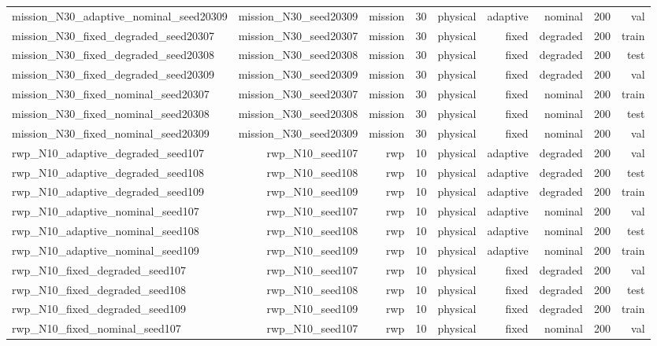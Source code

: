 \begin{tabular}{lrrrrrrrr}
mission\_N30\_adaptive\_nominal\_seed20309 & mission\_N30\_seed20309 & mission & 30 & physical & adaptive & nominal & 200 & val \\
mission\_N30\_fixed\_degraded\_seed20307 & mission\_N30\_seed20307 & mission & 30 & physical & fixed & degraded & 200 & train \\
mission\_N30\_fixed\_degraded\_seed20308 & mission\_N30\_seed20308 & mission & 30 & physical & fixed & degraded & 200 & test \\
mission\_N30\_fixed\_degraded\_seed20309 & mission\_N30\_seed20309 & mission & 30 & physical & fixed & degraded & 200 & val \\
mission\_N30\_fixed\_nominal\_seed20307 & mission\_N30\_seed20307 & mission & 30 & physical & fixed & nominal & 200 & train \\
mission\_N30\_fixed\_nominal\_seed20308 & mission\_N30\_seed20308 & mission & 30 & physical & fixed & nominal & 200 & test \\
mission\_N30\_fixed\_nominal\_seed20309 & mission\_N30\_seed20309 & mission & 30 & physical & fixed & nominal & 200 & val \\
rwp\_N10\_adaptive\_degraded\_seed107 & rwp\_N10\_seed107 & rwp & 10 & physical & adaptive & degraded & 200 & val \\
rwp\_N10\_adaptive\_degraded\_seed108 & rwp\_N10\_seed108 & rwp & 10 & physical & adaptive & degraded & 200 & test \\
rwp\_N10\_adaptive\_degraded\_seed109 & rwp\_N10\_seed109 & rwp & 10 & physical & adaptive & degraded & 200 & train \\
rwp\_N10\_adaptive\_nominal\_seed107 & rwp\_N10\_seed107 & rwp & 10 & physical & adaptive & nominal & 200 & val \\
rwp\_N10\_adaptive\_nominal\_seed108 & rwp\_N10\_seed108 & rwp & 10 & physical & adaptive & nominal & 200 & test \\
rwp\_N10\_adaptive\_nominal\_seed109 & rwp\_N10\_seed109 & rwp & 10 & physical & adaptive & nominal & 200 & train \\
rwp\_N10\_fixed\_degraded\_seed107 & rwp\_N10\_seed107 & rwp & 10 & physical & fixed & degraded & 200 & val \\
rwp\_N10\_fixed\_degraded\_seed108 & rwp\_N10\_seed108 & rwp & 10 & physical & fixed & degraded & 200 & test \\
rwp\_N10\_fixed\_degraded\_seed109 & rwp\_N10\_seed109 & rwp & 10 & physical & fixed & degraded & 200 & train \\
rwp\_N10\_fixed\_nominal\_seed107 & rwp\_N10\_seed107 & rwp & 10 & physical & fixed & nominal & 200 & val \\

\end{tabular}

